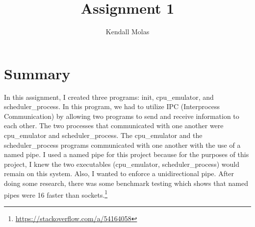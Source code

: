 \documentclass[a4paper,11pt]{report}
\title{Assignment 1}
\author{Kendall Molas}
\begin{document}
\maketitle

\section*{Summary}

In this assignment, I created three programs: init, cpu\_emulator, and scheduler\_process. In this program, we had to utilize IPC (Interprocess Communication) by allowing two programs to send and receive information to each other. The two processes that communicated with one another were cpu\_emulator and scheduler\_process. The cpu\_emulator and the scheduler\_process programs communicated with one another with the use of a named pipe. I used a named pipe for this project because for the purposes of this project, I knew the two executables (cpu\_emulator, scheduler\_process) would remain on this system. Also, I wanted to enforce a unidirectional pipe. After doing some research, there was some benchmark testing which shows that named pipes were 16 faster than sockets.\footnote{\url{https://stackoverflow.com/a/54164058}}
\end{document}
